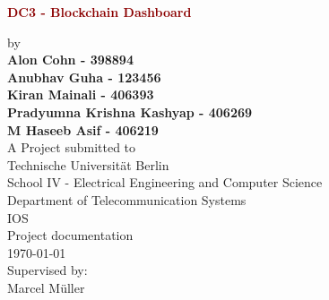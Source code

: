 \begin{titlepage}
	\strut
	\hfill
	\begin{center}
	\vspace{1cm}
		\Huge
		\begin{spacing}{.9}
			\textcolor{DarkRed}{\textbf{DC3 - Blockchain Dashboard}}\\
		\end{spacing}
		\vspace{0.8cm}
		\large
		by\\
		\vspace{0.8cm}
		\textbf{Alon Cohn - 398894}\\
		\textbf{Anubhav Guha - 123456}\\
		\textbf{Kiran Mainali - 406393}\\
		\textbf{Pradyumna Krishna Kashyap - 406269}\\
		\textbf{M Haseeb Asif - 406219}\\
		\vspace{0.8cm}
		\vspace{2cm}
	 	A Project submitted to\\
		\vspace{0.5cm}
		Technische Universität Berlin\\
		School IV - Electrical Engineering and Computer Science\\
		Department of Telecommunication Systems\\
		IOS\\
		\vspace{0.5cm}
		Project documentation\\
		\vspace{2.2cm}
		\today\\
		\vspace{2.0cm}
		\large
		Supervised by:\\
    	Marcel Müller\\
		\vspace{1cm}
		\end{center}
\end{titlepage}


